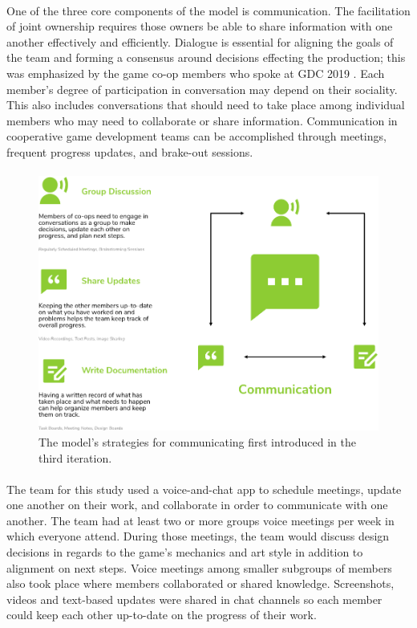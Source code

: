 \paragraph{} One of the three core components of the model is communication. The facilitation of joint ownership requires those owners be able to share information with one another effectively and efficiently. Dialogue is essential for aligning the goals of the team and forming a consensus around decisions effecting the production; this was emphasized by the game co-op members who spoke at GDC 2019 \autocite{game_developers_conference_embracing_2019}. Each member's degree of participation in conversation may depend on their sociality. This also includes conversations that should need to take place among individual members who may need to collaborate or share information. Communication in cooperative game development teams can be accomplished through meetings, frequent progress updates, and brake-out sessions.

\paragraph{}

\begin{figure}[h!]
    \centering
    \includegraphics[width=\linewidth]{Figures/Communication.png}
    \caption{The model's strategies for communicating first introduced in the third iteration.}
\end{figure}

\paragraph{} The team for this study used a voice-and-chat app to schedule meetings, update one another on their work, and collaborate in order to communicate with one another. The team had at least two or more groups voice meetings per week in which everyone attend. During those meetings, the team would discuss design decisions in regards to the game's mechanics and art style in addition to alignment on next steps. Voice meetings among smaller subgroups of members also took place where members collaborated or shared knowledge. Screenshots, videos and text-based updates were shared in chat channels so each member could keep each other up-to-date on the progress of their work.

